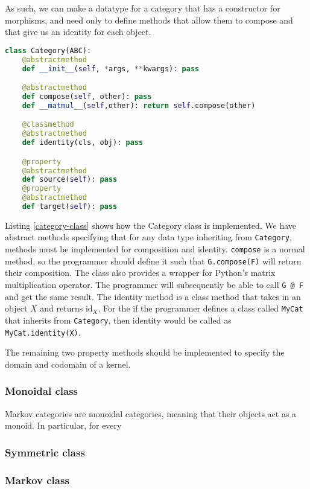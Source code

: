 As such, we can make a datatype for a category that has a constructor for morphisms, and need only to define methods that allow them to compose and that give us an identity for each object.

\begin{lstlisting}[caption=The category class within category.py, label=category-class, float, floatplacement=H, language=Python, frame=single]
class Category(ABC):
    @abstractmethod
    def __init__(self, *args, **kwargs): pass

    @abstractmethod
    def compose(self, other): pass
    def __matmul__(self,other): return self.compose(other)

    @classmethod
    @abstractmethod
    def identity(cls, obj): pass

    @property
    @abstractmethod
    def source(self): pass
    @property
    @abstractmethod
    def target(self): pass
\end{lstlisting}

Listing \ref{category-class} shows how the Category class is implemented.
We have abstract methods specifying that for any data type inheriting from \lstinline{Category}, methods must be implemented for composition and identity.
\lstinline{compose} is a normal method, so the programmer should define it such that \lstinline{G.compose(F)} will return their composition.
The class also provides a wrapper for Python's matrix multiplication operator.
The programmer will subsequently be able to call \lstinline{G @ F} and get the same result.
The identity method is a class method that takes in an object $X$ and returns $\mathrm{id}_X$.
For the if the programmer defines a class called \lstinline{MyCat} that inherits from \lstinline{Category}, then identity would be called as \lstinline{MyCat.identity(X)}.

The remaining two property methods should be implemented to specify the domain and codomain of a kernel.

\subsubsection{Monoidal class}

Markov categories are monoidal categories, meaning that their objects act as a monoid.
In particular, for every 
\subsubsection{Symmetric class}
\subsubsection{Markov class}

